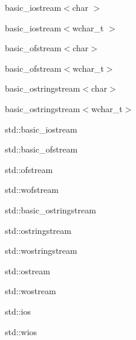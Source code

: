 \begin{DoxyCompactList}
\begin{DoxyCompactList}
\begin{DoxyCompactList}
\begin{DoxyCompactList}
\item basic\+\_\+iostream$<$char $>$\item basic\+\_\+iostream$<$wchar\+\_\+t $>$\item basic\+\_\+ofstream$<$char$>$\item basic\+\_\+ofstream$<$wchar\+\_\+t$>$\item basic\+\_\+ostringstream$<$char$>$\item basic\+\_\+ostringstream$<$wchar\+\_\+t$>$\item std\+:\+:basic\+\_\+iostream\item std\+:\+:basic\+\_\+ofstream\begin{DoxyCompactList}
\item std\+:\+:ofstream\item std\+:\+:wofstream\end{DoxyCompactList}
\item std\+:\+:basic\+\_\+ostringstream\begin{DoxyCompactList}
\item std\+:\+:ostringstream\item std\+:\+:wostringstream\end{DoxyCompactList}
\item std\+:\+:ostream\item std\+:\+:wostream\end{DoxyCompactList}
\item std\+:\+:ios\item std\+:\+:wios\end{DoxyCompactList}
\end{DoxyCompactList}

\end{DoxyCompactList}
